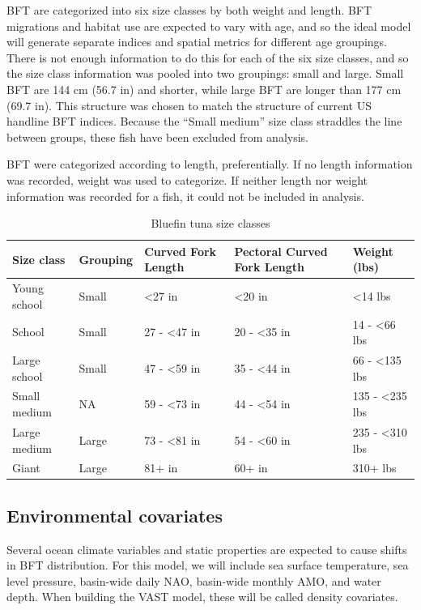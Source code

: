 \documentclass[
]{article}
\begin{document}
BFT are categorized into six size classes by both weight and length. BFT migrations and habitat use are expected to vary with age, and so the ideal model will generate separate indices and spatial metrics for different age groupings. There is not enough information to do this for each of the six size classes, and so the size class information was pooled into two groupings: small and large. Small BFT are 144 cm (56.7 in) and shorter, while large BFT are longer than 177 cm (69.7 in). This structure was chosen to match the structure of current US handline BFT indices. Because the ``Small medium'' size class straddles the line between groups, these fish have been excluded from analysis.

BFT were categorized according to length, preferentially. If no length information was recorded, weight was used to categorize. If neither length nor weight information was recorded for a fish, it could not be included in analysis.

\begin{table}[H]

\caption{\label{tab:size-table}Bluefin tuna size classes}
\centering
\begin{tabular}[t]{lllll}
\toprule
Size class & Grouping & Curved Fork
Length & Pectoral Curved
Fork Length & Weight (lbs)\\
\midrule
Young school & Small & <27 in & <20 in & <14 lbs\\
School & Small & 27 - <47 in & 20 - <35 in & 14 - <66 lbs\\
Large school & Small & 47 - <59 in & 35 - <44 in & 66 - <135 lbs\\
Small medium & NA & 59 - <73 in & 44 - <54 in & 135 - <235 lbs\\
Large medium & Large & 73 - <81 in & 54 - <60 in & 235 - <310 lbs\\
\addlinespace
Giant & Large & 81+ in & 60+ in & 310+ lbs\\
\bottomrule
\end{tabular}
\end{table}

\hypertarget{environmental-covariates}{%
\subsection{Environmental covariates}\label{environmental-covariates}}

Several ocean climate variables and static properties are expected to cause shifts in BFT distribution. For this model, we will include sea surface temperature, sea level pressure, basin-wide daily NAO, basin-wide monthly AMO, and water depth. When building the VAST model, these will be called density covariates.
\end{document}
